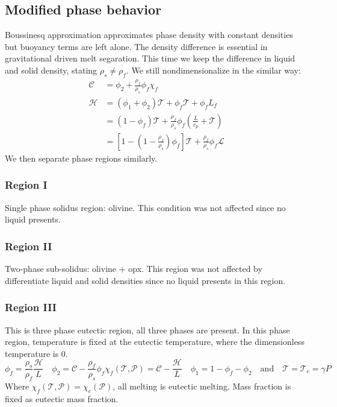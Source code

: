 \subsection{Modified phase behavior}
Boussinesq approximation approximates phase density with constant densities but
buoyancy terms are left alone.
The density difference is essential in gravitational driven melt segaration\cite{MagmaDynamicsEnthalpyMethod}.
This time we keep the difference in liquid and solid density, stating 
$\rho_s \neq \rho_f$.
We still nondimensionalize in the similar way:
\begin{equation}
\begin{aligned}
\mathcal{C} &= \phi_2 + \frac{\rho_f}{\rho_s}\phi_f \chi_f \\
\mathcal{H} &= (\phi_1 + \phi_2)\mathcal{T} + \phi_f\mathcal{T} + \phi_f L_f \\
            &= (1-\phi_f)\mathcal{T} + 
               \frac{\rho_f}{\rho_s}\phi_f(\frac{L}{c_p} + \mathcal{T})\\
            &= [1-(1-\frac{\rho_f}{\rho_s})\phi_f]\mathcal{T} + 
               \frac{\rho_f}{\rho_s}\phi_f\mathcal{L}
\end{aligned}
\end{equation}
We then separate phase regions similarly.

\subsubsection{Region I}
Single phase solidus region: olivine.
This condition was not affected since no liquid presents.

\subsubsection{Region II}
Two-phase sub-solidus: olivine + opx.
This region was not affected by differentiate liquid and solid densities
since no liquid presents in this region.

\subsubsection{Region III}
This is three phase eutectic region, all three phases are present.
In this phase region, temperature is fixed at the eutectic temperature,
where the dimensionless temperature is 0.
\begin{equation}
		  \phi_f = \frac{\rho_s}{\rho_f}\frac{\mathcal{H}}{L} \quad \phi_2 = \mathcal{C} - \frac{\rho_f}{\rho_s}\phi_f\chi_f(\mathcal{T}, \mathcal{P}) = \mathcal{C} - \frac{\mathcal{H}}{L}  \quad \phi_1 = 1-\phi_f - \phi_2 \quad \text{and} \quad \mathcal{T} = \mathcal{T}_e = \gamma P
\end{equation}
Where $\chi_f(\mathcal{T}, \mathcal{P}) = \chi_e(\mathcal{P})$, all melting is 
eutectic melting. Mass fraction is fixed as eutectic mass fraction.

